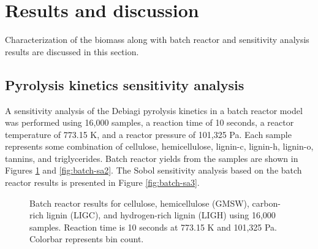 
\section{Results and discussion}

Characterization of the biomass along with batch reactor and sensitivity analysis results are discussed in this section.

\subsection{Pyrolysis kinetics sensitivity analysis}

A sensitivity analysis of the Debiagi pyrolysis kinetics in a batch reactor model was performed using 16,000 samples, a reaction time of 10 seconds, a reactor temperature of 773.15 K, and a reactor pressure of 101,325 Pa. Each sample represents some combination of cellulose, hemicellulose, lignin-c, lignin-h, lignin-o, tannins, and triglycerides. Batch reactor yields from the samples are shown in Figures \ref{fig:batch-sa1} and \ref{fig:batch-sa2}. The Sobol sensitivity analysis based on the batch reactor results is presented in Figure \ref{fig:batch-sa3}.

\begin{figure}[H]
    \centering
    \caption{Batch reactor results for cellulose, hemicellulose (GMSW), carbon-rich lignin (LIGC), and hydrogen-rich lignin (LIGH) using 16,000 samples. Reaction time is 10 seconds at 773.15 K and 101,325 Pa. Colorbar represents bin count.}
    \label{fig:batch-sa1}
\end{figure}

